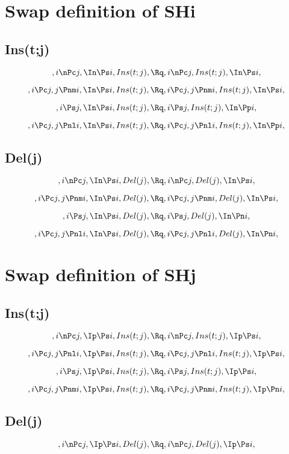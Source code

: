 \bigskip
\bigskip
\bigskip
\bigskip
\section{Swap definition of SHi}
\subsection{Ins(t;j)}
\[, i \nPc j, \In \Ps i, Ins(t;j), \Rq , i \nPc j, Ins(t;j), \In \Ps i, \]

\[, i \Pc j, j \Pnm i, \In \Ps i, Ins(t;j), \Rq , i \Pc j, j \Pnm i, Ins(t;j), \In \Ps i,\]

\[, i \Ps j, \In \Ps i, Ins(t;j), \Rq , i \Ps j, Ins(t;j), \In \Pp i,\]

\[, i \Pc j, j \Pnl i, \In \Ps i, Ins(t;j), \Rq , i \Pc j, j \Pnl i, Ins(t;j), \In \Pp i,\]

\bigskip
\bigskip
\subsection{Del(j)}
\[, i \nPc j, \In \Ps i, Del(j), \Rq , i \nPc j, Del(j), \In \Ps i, \]

\[, i \Pc j, j \Pnm i, \In \Ps i, Del(j), \Rq , i \Pc j, j \Pnm i, Del(j), \In \Ps i,\]

\[, i \Ps j, \In \Ps i, Del(j), \Rq , i \Ps j, Del(j), \In \Pn i,\]

\[, i \Pc j, j \Pnl i, \In \Ps i, Del(j), \Rq , i \Pc j, j \Pnl i, Del(j), \In \Pn i,\]




\bigskip
\bigskip
\section{Swap definition of SHj}
\subsection{Ins(t;j)}
\[, i \nPc j, \Ip \Ps i, Ins(t;j), \Rq , i \nPc j, Ins(t;j), \Ip \Ps i, \]

\[, i \Pc j, j \Pnl i, \Ip \Ps i, Ins(t;j), \Rq , i \Pc j, j \Pnl i, Ins(t;j), \Ip \Ps i,\]

\[, i \Ps j, \Ip \Ps i, Ins(t;j), \Rq , i \Ps j, Ins(t;j), \Ip \Ps i,\]

\[, i \Pc j, j \Pnm i, \Ip \Ps i, Ins(t;j), \Rq , i \Pc j, j \Pnm i, Ins(t;j), \Ip \Pn i,\]

\bigskip
\bigskip
\subsection{Del(j)}
\[, i \nPc j, \Ip \Ps i, Del(j), \Rq , i \nPc j, Del(j), \Ip \Ps i, \]

